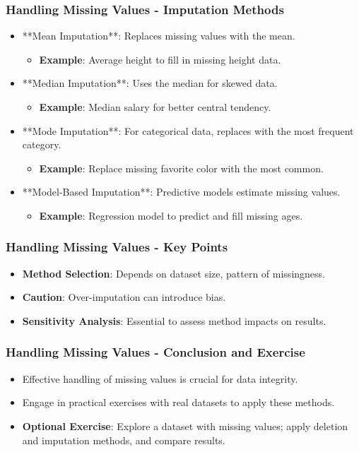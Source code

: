 \documentclass[aspectratio=169]{beamer}
\begin{document}
\begin{frame}[fragile]
    \frametitle{Handling Missing Values - Imputation Methods}
    \begin{itemize}
        \item **Mean Imputation**: Replaces missing values with the mean.
            \begin{itemize}
                \item \textbf{Example}: Average height to fill in missing height data.
            \end{itemize}
        \item **Median Imputation**: Uses the median for skewed data.
            \begin{itemize}
                \item \textbf{Example}: Median salary for better central tendency.
            \end{itemize}
        \item **Mode Imputation**: For categorical data, replaces with the most frequent category.
            \begin{itemize}
                \item \textbf{Example}: Replace missing favorite color with the most common.
            \end{itemize}
        \item **Model-Based Imputation**: Predictive models estimate missing values.
            \begin{itemize}
                \item \textbf{Example}: Regression model to predict and fill missing ages.
            \end{itemize}
    \end{itemize}
\end{frame}

\begin{frame}[fragile]
    \frametitle{Handling Missing Values - Key Points}
    \begin{itemize}
        \item \textbf{Method Selection}: Depends on dataset size, pattern of missingness.
        \item \textbf{Caution}: Over-imputation can introduce bias.
        \item \textbf{Sensitivity Analysis}: Essential to assess method impacts on results.
    \end{itemize}
\end{frame}

\begin{frame}[fragile]
    \frametitle{Handling Missing Values - Conclusion and Exercise}
    \begin{itemize}
        \item Effective handling of missing values is crucial for data integrity.
        \item Engage in practical exercises with real datasets to apply these methods.
        \item \textbf{Optional Exercise}: Explore a dataset with missing values; apply deletion and imputation methods, and compare results.
    \end{itemize}
\end{frame}
\end{document}
